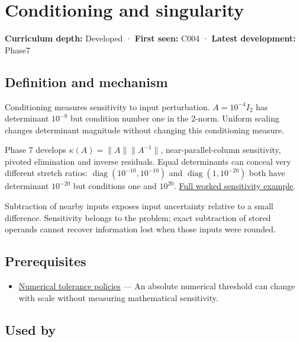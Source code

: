 \hypertarget{appendix-8f6a01f284a7}{}
\section{Conditioning and singularity}\label{appendix-8f6a01f284a7-conditioning-and-singularity}

\textbf{Curriculum depth:} Developed · \textbf{First seen:} C004 · \textbf{Latest development:} Phase7

\subsection{Definition and mechanism}\label{appendix-8f6a01f284a7-definition-and-mechanism}

Conditioning measures sensitivity to input perturbation. \(A=10^{-4}I_2\) has determinant \(10^{-8}\) but condition number one in the 2-norm. Uniform scaling changes determinant magnitude without changing this conditioning measure.

Phase 7 develops \(\kappa(A)=\|A\|\|A^{-1}\|\), near-parallel-column sensitivity, pivoted elimination and inverse residuals. Equal determinants can conceal very different stretch ratios: \(\operatorname{diag}(10^{-10},10^{-10})\) and \(\operatorname{diag}(1,10^{-20})\) both have determinant \(10^{-20}\) but conditions one and \(10^{20}\). \hyperref[01-foundations-i-ch018-an-inverse-can-exist-and-still-amplify-uncertainty]{Full worked sensitivity example}.

Subtraction of nearby inputs exposes input uncertainty relative to a small difference. Sensitivity belongs to the problem; exact subtraction of stored operands cannot recover information lost when those inputs were rounded.

\subsection{Prerequisites}\label{appendix-8f6a01f284a7-prerequisites}

\begin{itemize}
\tightlist
\item
  \hyperref[appendix-0ec599f8ba27]{Numerical tolerance policies} --- An absolute numerical threshold can change with scale without measuring mathematical sensitivity.
\end{itemize}

\subsection{Used by}\label{appendix-8f6a01f284a7-used-by}


